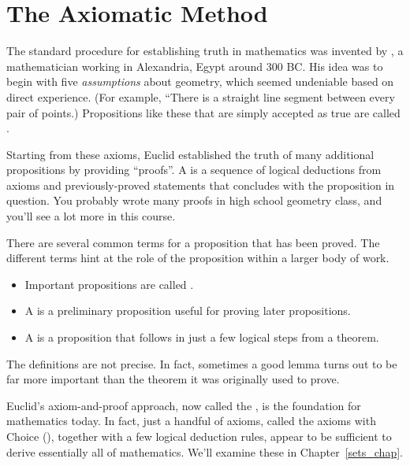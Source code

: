 
\section{The Axiomatic Method}

The standard procedure for establishing truth in mathematics was invented
by , a mathematician working in Alexandria, Egypt around 300 BC.
His idea was to begin with five \textit{assumptions} about geometry, which
seemed undeniable based on direct experience.  (For example, ``There is a
straight line segment between every pair of points.)  Propositions like
these that are simply accepted as true are called .

Starting from these axioms, Euclid established the truth of many
additional propositions by providing ``proofs''.  A  is a
sequence of logical deductions from axioms and previously-proved
statements that concludes with the proposition in question.  You
probably wrote many proofs in high school geometry class, and you'll
see a lot more in this course.

There are several common terms for a proposition that has been proved.
The different terms hint at the role of the proposition within a
larger body of work.
%
\begin{itemize}
\item Important propositions are called .
\item A  is a preliminary proposition useful for proving
later propositions.
\item A  is a proposition that follows
in just a few logical steps from a theorem.  
\end{itemize}
%
The definitions are not precise.  In fact, sometimes a good lemma
turns out to be far more important than the theorem it was originally
used to prove.

Euclid's axiom-and-proof approach, now called the , is the foundation for mathematics today.  In fact, just a
handful of axioms, called the axioms  with Choice
(), together with a few logical deduction rules, appear to
be sufficient to derive essentially all of mathematics.  We'll examine
these in Chapter~\ref{sets_chap}.


